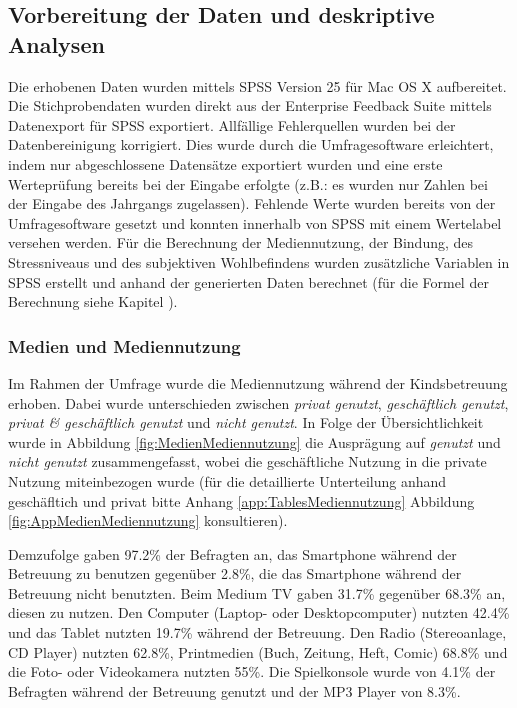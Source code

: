 \subsection{Vorbereitung der Daten und deskriptive Analysen}
Die erhobenen Daten wurden mittels SPSS Version 25 für Mac OS X aufbereitet. Die Stichprobendaten wurden direkt aus der Enterprise Feedback Suite \cite{Questback2018} mittels Datenexport für SPSS exportiert. Allfällige Fehlerquellen wurden bei der Datenbereinigung korrigiert. Dies wurde durch die Umfragesoftware erleichtert, indem nur abgeschlossene Datensätze exportiert wurden und eine erste Werteprüfung bereits bei der Eingabe erfolgte (z.B.: es wurden nur Zahlen bei der Eingabe des Jahrgangs zugelassen). Fehlende Werte wurden bereits von der Umfragesoftware gesetzt und konnten innerhalb von SPSS mit einem Wertelabel versehen werden. Für die Berechnung der Mediennutzung, der Bindung, des Stressniveaus und des subjektiven Wohlbefindens wurden zusätzliche Variablen in SPSS erstellt und anhand der generierten Daten berechnet (für die Formel der Berechnung siehe Kapitel ).

\subsubsection{Medien und Mediennutzung}
Im Rahmen der Umfrage wurde die Mediennutzung während der Kindsbetreuung erhoben. Dabei wurde unterschieden zwischen \textit{privat genutzt}, \textit{geschäftlich genutzt}, \textit{privat \& geschäftlich genutzt} und \textit{nicht genutzt}. In Folge der Übersichtlichkeit wurde in Abbildung \ref{fig:MedienMediennutzung} die Ausprägung auf \textit{genutzt} und \textit{nicht genutzt} zusammengefasst, wobei die geschäftliche Nutzung in die private Nutzung miteinbezogen wurde (für die detaillierte Unterteilung anhand geschäfltich und privat bitte Anhang \ref{app:TablesMediennutzung} Abbildung \ref{fig:AppMedienMediennutzung} konsultieren).

Demzufolge gaben 97.2\% der Befragten an, das Smartphone während der Betreuung zu benutzen gegenüber 2.8\%, die das Smartphone während der Betreuung nicht benutzten. Beim Medium TV gaben 31.7\% gegenüber 68.3\% an, diesen zu nutzen. Den Computer (Laptop- oder Desktopcomputer) nutzten 42.4\% und das Tablet nutzten 19.7\% während der Betreuung. Den Radio (Stereoanlage, CD Player) nutzten 62.8\%, Printmedien (Buch, Zeitung, Heft, Comic) 68.8\% und die Foto- oder Videokamera nutzten 55\%. Die Spielkonsole wurde von 4.1\% der Befragten während der Betreuung genutzt und der MP3 Player von 8.3\%.

